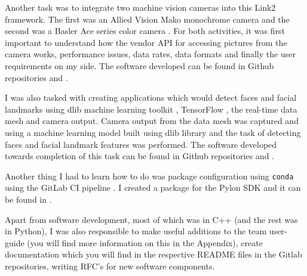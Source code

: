 \documentclass[a4paper, 12pt, oneside]{report}
\begin{document}
  Another task was to integrate two machine vision cameras into this Link2 \cite{ReactiveMeshforRealtimeDataProcessingDRAIVELinkDocumentation-2019-12-09} framework. The first was an Allied Vision Mako monochrome camera \cite{MakoGDocumentationAlliedVision-2020-02-12} and the second was a Basler Ace series color camera \cite{BasleraceacA130075gcAreaScanCamera-2020-02-12}. For both activities, it was first important to understand how the vendor API for accessing pictures from the camera works, performance issues, data rates, data formats and finally the user requirements on my side. The software developed can be found in Github repositories \cite{NumericalAdvantageldnodecameraavt2ALink2nodetointerfacewithAlliedVisionMakoGmonochromemachinevisioncamera-2020-02-20} and \cite{NumericalAdvantageldnodecamerabaslerALink2nodetointerfaceaBasleraceseriesmachinevisioncamera-2020-02-20}.
  
  I was also tasked with creating applications which would detect faces and facial landmarks using dlib machine learning toolkit \cite{dlib09}, TensorFlow \cite{TensorFlowCReferenceTensorFlowCorev210-2020-02-10}, the real-time data mesh \cite{ReactiveMeshforRealtimeDataProcessingDRAIVELinkDocumentation-2019-12-09} and camera output. Camera output from the data mesh was captured and using a machine learning model built using dlib library \cite{dlibCLibrary-2020-02-12} and \cite{feng2018prn} the task of detecting faces and facial landmark features was performed. The software developed towards completion of this task can be found in Github repositories \cite{NumericalAdvantageldnodefacedetector2ALink2nodetodetectfacesinastreamofvideo-2020-02-20} and \cite{NumericalAdvantageldnodefaciallandmarkdetector2ALink2nodetodetectfacialfeatures-2020-02-20}. 
  
  Another thing I had to learn how to do was package configuration using \texttt{conda} \cite{CondaCondadocumentation-2019-10-31} using the GitLab CI pipeline \cite{CreatingandusingCICDpipelinesGitLab-2020-02-18}. I created a package for the Pylon SDK \cite{pylonOpenSource-2020-02-14} and it can be found in \cite{NumericalAdvantagepylonsdkApackageconfigfortheopensourcePylonSDKformBaserAG-2020-02-20}.
  
  Apart from software development, most of which was in C++ (and the rest was in Python), I was also responsible to make useful additions to the team user-guide \cite{IntroductionStudentGuide-2020-01-20} (you will find more information on this in the Appendix), create documentation which you will find in the respective README files in the Gitlab repositories, writing RFC's \cite{IntroductionLinkDevelopersRFC-2020-01-16} for new software components.
\end{document}
